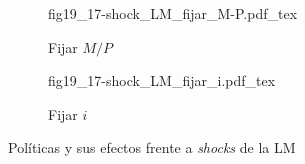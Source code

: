 \begin{figure}[h]
\captionsetup[subfigure]{aboveskip=20pt,belowskip=15pt}
\centering
\begin{subfigure}{.45\textwidth}
  \centering
        \def\svgwidth{\textwidth}
        {fig19_17-shock_LM_fijar_M-P.pdf_tex}
  \caption{Fijar $M/P$}
  \label{fig19_17-shock_LM_fijar_M-P}
\end{subfigure}\hspace{.05\textwidth}
\begin{subfigure}{.45\textwidth}
  \centering
        \def\svgwidth{\textwidth}
        {fig19_17-shock_LM_fijar_i.pdf_tex}
  \caption{Fijar $i$}
  \label{fig19_17-shock_LM_fijar_i}
\end{subfigure}
\caption{Políticas y sus efectos frente a \textit{shocks} de la LM}
\label{fig19_17-shock_LM}
\end{figure}
